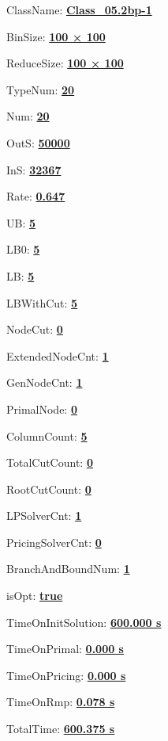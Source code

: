 \documentclass[11pt]{article}
\begin{document}
\pagestyle{empty}


ClassName: \underline{\textbf{Class_05.2bp-1}}
\par
BinSize: \underline{\textbf{100 × 100}}
\par
ReduceSize: \underline{\textbf{100 × 100}}
\par
TypeNum: \underline{\textbf{20}}
\par
Num: \underline{\textbf{20}}
\par
OutS: \underline{\textbf{50000}}
\par
InS: \underline{\textbf{32367}}
\par
Rate: \underline{\textbf{0.647}}
\par
UB: \underline{\textbf{5}}
\par
LB0: \underline{\textbf{5}}
\par
LB: \underline{\textbf{5}}
\par
LBWithCut: \underline{\textbf{5}}
\par
NodeCut: \underline{\textbf{0}}
\par
ExtendedNodeCnt: \underline{\textbf{1}}
\par
GenNodeCnt: \underline{\textbf{1}}
\par
PrimalNode: \underline{\textbf{0}}
\par
ColumnCount: \underline{\textbf{5}}
\par
TotalCutCount: \underline{\textbf{0}}
\par
RootCutCount: \underline{\textbf{0}}
\par
LPSolverCnt: \underline{\textbf{1}}
\par
PricingSolverCnt: \underline{\textbf{0}}
\par
BranchAndBoundNum: \underline{\textbf{1}}
\par
isOpt: \underline{\textbf{true}}
\par
TimeOnInitSolution: \underline{\textbf{600.000 s}}
\par
TimeOnPrimal: \underline{\textbf{0.000 s}}
\par
TimeOnPricing: \underline{\textbf{0.000 s}}
\par
TimeOnRmp: \underline{\textbf{0.078 s}}
\par
TotalTime: \underline{\textbf{600.375 s}}
\par
\newpage


\end{document}
